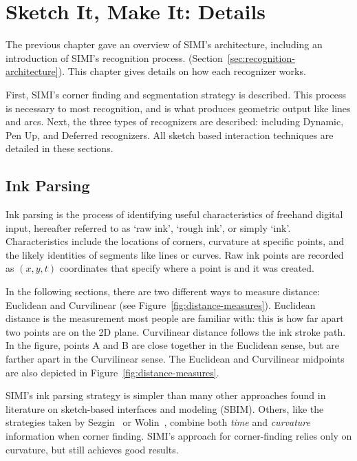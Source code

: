 \chapter{Sketch It, Make It: Details}
\label{sec:details}

The previous chapter gave an overview of SIMI's architecture,
including an introduction of SIMI's recognition process.
(Section~\ref{sec:recognition-architecture}). This chapter gives
details on how each recognizer works.

First, SIMI's corner finding and segmentation strategy is
described. This process is necessary to most recognition, and is what
produces geometric output like lines and arcs. Next, the three types
of recognizers are described: including Dynamic, Pen Up, and Deferred
recognizers. All sketch based interaction techniques are detailed in
these sections.

\section{Ink Parsing}
\label{sec:corner-finder}

Ink parsing is the process of identifying useful characteristics of
freehand digital input, hereafter referred to as `raw ink', `rough
ink', or simply `ink'. Characteristics include the locations of
corners, curvature at specific points, and the likely identities of
segments like lines or curves. Raw ink points are recorded as $(x, y,
t)$ coordinates that specify where a point is and it was created.

In the following sections, there are two different ways to measure
distance: Euclidean and Curvilinear (see
Figure~\ref{fig:distance-measures}). Euclidean distance is the
measurement most people are familiar with: this is how far apart two
points are on the 2D plane. Curvilinear distance follows the ink
stroke path. In the figure, points A and B are close together in the
Euclidean sense, but are farther apart in the Curvilinear sense. The
Euclidean and Curvilinear midpoints are also depicted in
Figure~\ref{fig:distance-measures}. 



SIMI's ink parsing strategy is simpler than many other approaches
found in literature on sketch-based interfaces and modeling
(SBIM). Others, like the strategies taken by
Sezgin~\cite{sezgin-early-processing} or Wolin~\cite{wolin-smr},
combine both \textit{time} and \textit{curvature} information when
corner finding. SIMI's approach for corner-finding relies only on
curvature, but still achieves good results.

